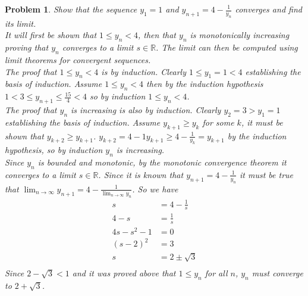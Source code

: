 \documentclass{article}
\newtheorem*{Problem}{Problem}
\begin{document}
\begin{Problem}
Show that the sequence $y_1=1$ and $y_{n+1}=4-\frac{1}{y_n}$ converges and find its limit. \\
It will first be shown that $1\leq y_n<4$, then that $y_n$ is monotonically increasing proving that $y_n$ converges to a limit $s\in\mathbb{R}$.  The limit can then be computed using limit theorems for convergent sequences.\\
The proof that $1\leq y_n<4$ is by induction.  Clearly $1\leq y_1=1<4$ establishing the basis of induction.  Assume $1\leq y_n<4$ then by the induction hypothesis $1<3\leq y_{n+1}\leq\frac{15}{4}<4$ so by induction $1\leq y_n<4$.\\
The proof that $y_n$ is increasing is also by induction.  Clearly $y_2=3>y_1=1$ establishing the basis of induction.  Assume $y_{k+1}\geq y_k$ for some $k$, it must be shown that $y_{k+2}\geq y_{k+1}$.  $y_{k+2}=4-{1}{y_{k+1}}\geq 4-\frac{1}{y_k}=y_{k+1}$ by the induction hypothesis, so by induction $y_n$ is increasing. \\
Since $y_n$ is bounded and monotonic, by the monotonic convergence theorem it converges to a limit $s\in\mathbb{R}$.  Since it is known that $y_{n+1}=4-\frac{1}{y_n}$ it must be true that $\lim_{n\to\infty}y_{n+1}=4-\frac{1}{\lim_{n\to\infty}y_n}$. So we have 
\begin{align*}
    s&=4-\frac{1}{s} \\
    4-s&=\frac{1}{s} \\
    4s-s^2-1&=0 \\
    (s-2)^2 &=3 \\
    s&=2\pm \sqrt{3} \\
\end{align*}
Since $2-\sqrt{3}<1$ and it was proved above that $1\leq y_n$ for all $n$, $y_n$ must converge to $2+\sqrt{3}$.
\end{Problem}
\end{document}
